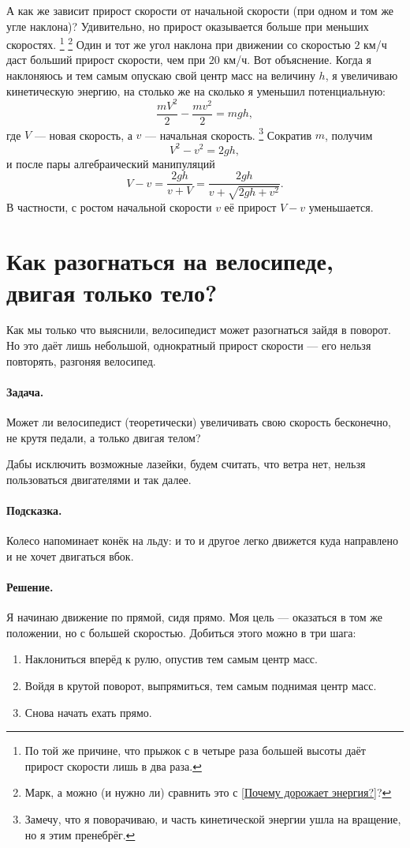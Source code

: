 А как же зависит прирост скорости от начальной скорости (при одном и том же угле наклона)?
Удивительно, но прирост оказывается больше при меньших скоростях.%
\footnote{По той же причине, что прыжок с в четыре раза большей высоты даёт прирост скорости лишь в два раза.}%
\footnote{Марк, а можно (и нужно ли) сравнить это с \ref{Почему дорожает энергия?}?\pr}
Один и тот же угол наклона при движении со скоростью $2$ км/ч даст больший прирост скорости, чем при $20$ км/ч.
Вот объяснение.
Когда я наклоняюсь и тем самым опускаю свой центр масс на
величину $h$, я увеличиваю кинетическую энергию, на столько же на сколько я уменьшил потенциальную:
\[
\frac{mV^2}2 - \frac{mv^2}2 = mgh,
\]
где $V$ — новая скорость, а $v$ — начальная скорость.%
\footnote{Замечу, что я поворачиваю, и часть кинетической энергии ушла на вращение, но я этим пренебрёг.}
Сократив $m$, получим
\[
V^2 - v^2 = 2gh,\]
и после пары алгебраический манипуляций
\[V - v=\frac{2gh}{v+V}=\frac{2gh}{v+\sqrt{2gh+v^2}}.\]
В частности,
с ростом начальной скорости $v$
её прирост $V - v$ уменьшается.

\section{Как разогнаться на велосипеде, двигая только тело?}\label{Как разогнаться на велосипеде, двигая только тело?}

Как мы только что выяснили, велосипедист может разогнаться зайдя в поворот.
Но это даёт лишь небольшой, однократный прирост скорости --- его нельзя повторять, разгоняя велосипед.

\paragraph{Задача.}
Может ли велосипедист (теоретически) увеличивать свою скорость бесконечно, не крутя педали, а только двигая телом?

Дабы исключить возможные лазейки, будем считать, что ветра нет, нельзя пользоваться двигателями и так далее.

\paragraph{Подсказка.}
Колесо напоминает конёк на льду: и то и другое легко движется куда направлено и не хочет двигаться вбок.

\paragraph{Решение.}
Я начинаю движение по прямой, сидя прямо.
Моя цель — оказаться в том же положении, но с большей скоростью.
Добиться этого можно в три шага:
\begin{enumerate}
\item Наклониться вперёд к рулю, опустив тем самым центр масс.
\item Войдя в крутой поворот, выпрямиться, тем самым поднимая центр масс.
\item Снова начать ехать прямо.
\end{enumerate}

